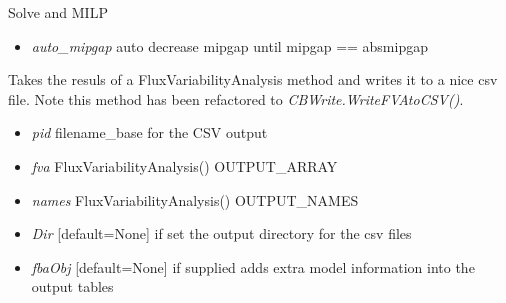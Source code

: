 \documentclass[a4paper,11pt,english]{sphinxmanual}
\begin{document}

\begin{fulllineitems}
\label{modules_doc:cbmpy.CBCPLEX.cplx_SolveMILP}
Solve and MILP
\begin{itemize}
\item {} 
\emph{auto\_mipgap} auto decrease mipgap until mipgap == absmipgap

\end{itemize}

\end{fulllineitems}


\begin{fulllineitems}
\label{modules_doc:cbmpy.CBCPLEX.cplx_WriteFVAtoCSV}
Takes the resuls of a FluxVariabilityAnalysis method and writes it to a nice
csv file. Note this method has been refactored to \emph{CBWrite.WriteFVAtoCSV()}.
\begin{itemize}
\item {} 
\emph{pid} filename\_base for the CSV output

\item {} 
\emph{fva} FluxVariabilityAnalysis() OUTPUT\_ARRAY

\item {} 
\emph{names} FluxVariabilityAnalysis() OUTPUT\_NAMES

\item {} 
\emph{Dir} {[}default=None{]} if set the output directory for the csv files

\item {} 
\emph{fbaObj} {[}default=None{]} if supplied adds extra model information into the output tables

\end{itemize}

\end{fulllineitems}

\end{document}
